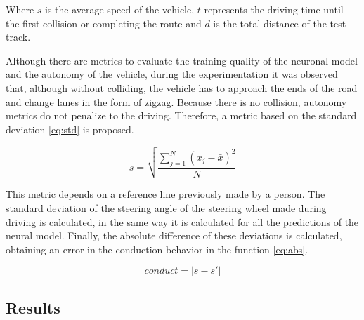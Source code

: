 \documentclass{cys}
\begin{document}
Where $s$ is the average speed of the vehicle, $t$ represents the driving time until the first collision or completing the route and $d$ is the total distance of the test track.

 
Although there are metrics to evaluate the training quality of the neuronal model and the autonomy of the vehicle, during the experimentation it was observed that, although without colliding, the vehicle has to approach the ends of the road and change lanes in the form of zigzag. Because there is no collision, autonomy metrics do not penalize to the driving. Therefore, a metric based on the standard deviation \ref{eq:std} \cite{spiegel1991estadistica} is proposed.

\begin{equation}
s = \sqrt{\frac{\displaystyle\sum_{j=1}^{N} (x_j - \bar{x})^2}{N}}
\label{eq:std}
\end{equation}


This metric depends on a reference line previously made by a person. The standard deviation of the steering angle of the steering wheel made during driving is calculated, in the same way it is calculated for all the predictions of the neural model. Finally, the absolute difference of these deviations is calculated, obtaining an error in the conduction behavior in the function \ref{eq:abs}.

\begin{equation}
	conduct = |s-s'|
	\label{eq:abs}
\end{equation}


\subsection{Results}
\end{document}

